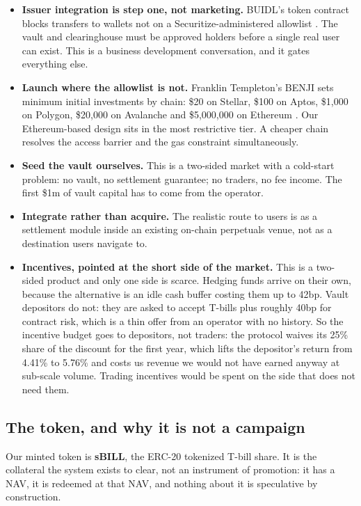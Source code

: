 \documentclass[11pt,a4paper]{article}
\begin{document}
\begin{itemize}
  \item \textbf{Issuer integration is step one, not marketing.} BUIDL's token contract blocks
  transfers to wallets not on a Securitize-administered allowlist \cite{ecokyc,coinpaprika}. The vault
  and clearinghouse must be approved holders before a single real user can exist. This is a business
  development conversation, and it gates everything else.
  \item \textbf{Launch where the allowlist is not.} Franklin Templeton's BENJI sets minimum initial
  investments by chain: \$20 on Stellar, \$100 on Aptos, \$1,000 on Polygon, \$20,000 on Avalanche and
  \$5,000,000 on Ethereum \cite{franklin}. Our Ethereum-based design sits in the most restrictive
  tier. A cheaper chain resolves the access barrier and the gas constraint simultaneously.
  \item \textbf{Seed the vault ourselves.} This is a two-sided market with a cold-start problem: no
  vault, no settlement guarantee; no traders, no fee income. The first \$1m of vault capital has to
  come from the operator.
  \item \textbf{Integrate rather than acquire.} The realistic route to users is as a settlement module
  inside an existing on-chain perpetuals venue, not as a destination users navigate to.
  \item \textbf{Incentives, pointed at the short side of the market.} This is a two-sided product and
  only one side is scarce. Hedging funds arrive on their own, because the alternative is an idle cash
  buffer costing them up to 42bp. Vault depositors do not: they are asked to accept T-bills plus
  roughly 40bp for contract risk, which is a thin offer from an operator with no history. So the
  incentive budget goes to depositors, not traders: the protocol waives its 25\% share of the
  discount for the first year, which lifts the depositor's return from 4.41\% to 5.76\% and costs us
  revenue we would not have earned anyway at sub-scale volume. Trading incentives would be spent on
  the side that does not need them.
\end{itemize}

\subsection{The token, and why it is not a campaign}

Our minted token is \textbf{sBILL}, the ERC-20 tokenized T-bill share. It is the collateral the
system exists to clear, not an instrument of promotion: it has a NAV, it is redeemed at that NAV, and
nothing about it is speculative by construction.
\end{document}
